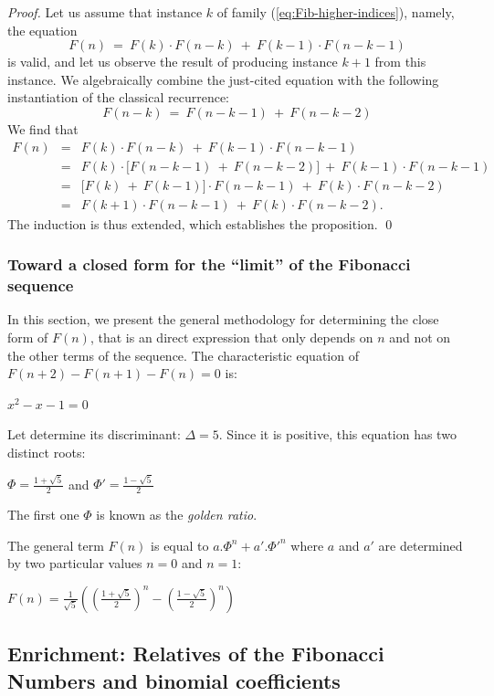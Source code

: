 \begin{proof}
Let us assume that instance $k$ of family
(\ref{eq:Fib-higher-indices}), namely, the equation
\[ F(n) \ = \ F(k) \cdot F(n-k) \ + \ F(k-1) \cdot F(n-k-1) \]
is valid, and let us observe the result of producing instance $k+1$
from this instance.  We algebraically combine the just-cited equation
with the following instantiation of the classical recurrence:
\[ F(n-k) \ = \ F(n-k-1) \ + \ F(n-k-2) \]
We find that
\begin{eqnarray*}
F(n) & = & F(k) \cdot F(n-k) \ + \ F(k-1) \cdot F(n-k-1) \\
     & = & F(k) \cdot \big[ F(n-k-1) \ + \ F(n-k-2) \big]  \ +
             \ F(k-1) \cdot F(n-k-1) \\
     & = & \big[ F(k) \ + \ F(k-1) \big] \cdot F(n-k-1) \ + \ F(k)
             \cdot F(n-k-2) \\
     & = & F(k+1) \cdot F(n-k-1) \ + \ F(k) \cdot F(n-k-2).
\end{eqnarray*}
The induction is thus extended, which establishes the proposition.
\qed 
\end{proof}

\subsubsection{Toward a closed form for the ``limit''  of the
  Fibonacci sequence}
\label{sec:Fib-Golden-Ratio}

In this section, we present the general methodology for determining
the close form of $F(n)$, that is an direct expression that only
depends on $n$ and not on the other terms of the sequence.  The
characteristic equation of $F(n+2) - F(n+1) - F(n) =0$ is:

$x^2 - x - 1 = 0$

Let determine its discriminant: $\Delta = 5$.
Since it is positive, this equation has two distinct roots:

$\Phi = \frac{1+\sqrt{5}}{2}$ and $\Phi' = \frac{1-\sqrt{5}}{2}$

The first one $\Phi$ is known as the \textit{golden ratio}. 

The general term $F(n)$ is equal to $a.\Phi^n + a'.\Phi'^n$ where $a$
and $a'$ are determined by two particular values $n=0$ and $n=1$:

$F(n)= \frac{1}{\sqrt{5}} ((\frac{1+\sqrt{5}}{2})^n - (\frac{1-\sqrt{5}}{2})^n)$


\subsection{Enrichment: Relatives of the Fibonacci Numbers and binomial coefficients}
\label{sec:Fibo-relatives}

